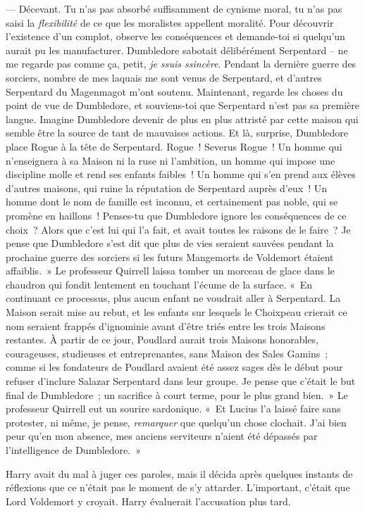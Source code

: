 --- Décevant. Tu n'as pas absorbé suffisamment de cynisme moral, tu n'as pas saisi la \emph{flexibilité} de ce que les moralistes appellent moralité. Pour découvrir l'existence d'un complot, observe les conséquences et demande-toi si quelqu'un aurait pu les manufacturer. Dumbledore sabotait délibérément Serpentard -- ne me regarde pas comme ça, petit, \emph{je ssuis ssincère}. Pendant la dernière guerre des sorciers, nombre de mes laquais me sont venus de Serpentard, et d'autres Serpentard du Magenmagot m'ont soutenu. Maintenant, regarde les choses du point de vue de Dumbledore, et souviens-toi que Serpentard n'est pas sa première langue. Imagine Dumbledore devenir de plus en plus attristé par cette maison qui semble être la source de tant de mauvaises actions. Et là, surprise, Dumbledore place Rogue à la tête de Serpentard. Rogue~! Severus Rogue~! Un homme qui n'enseignera à sa Maison ni la ruse ni l'ambition, un homme qui impose une discipline molle et rend ses enfants faibles~! Un homme qui s'en prend aux élèves d'autres maisons, qui ruine la réputation de Serpentard auprès d'eux~! Un homme dont le nom de famille est inconnu, et certainement pas noble, qui se promène en haillons~! Penses-tu que Dumbledore ignore les conséquences de ce choix~? Alors que c'est lui qui l'a fait, et avait toutes les raisons de le faire~? Je pense que Dumbledore s'est dit que plus de vies seraient sauvées pendant la prochaine guerre des sorciers si les futurs Mangemorts de Voldemort étaient affaiblis.~» Le professeur Quirrell laissa tomber un morceau de glace dans le chaudron qui fondit lentement en touchant l'écume de la surface. «~En continuant ce processus, plus aucun enfant ne voudrait aller à Serpentard. La Maison serait mise au rebut, et les enfants sur lesquels le Choixpeau crierait ce nom seraient frappés d'ignominie avant d'être triés entre les trois Maisons restantes. À partir de ce jour, Poudlard aurait trois Maisons honorables, courageuses, studieuses et entreprenantes, sans Maison des Sales Gamins~; comme si les fondateurs de Poudlard avaient été assez sages dès le début pour refuser d'inclure Salazar Serpentard dans leur groupe. Je pense que c'était le but final de Dumbledore~; un sacrifice à court terme, pour le plus grand bien.~» Le professeur Quirrell eut un sourire sardonique. «~Et Lucius l'a laissé faire sans protester, ni même, je pense, \emph{remarquer} que quelqu'un chose clochait. J'ai bien peur qu'en mon absence, mes anciens serviteurs n'aient été dépassés par l'intelligence de Dumbledore.~»

Harry avait du mal à juger ces paroles, mais il décida après quelques instants de réflexions que ce n'était pas le moment de s'y attarder. L'important, c'était que Lord Voldemort y croyait. Harry évaluerait l'accusation plus tard.

